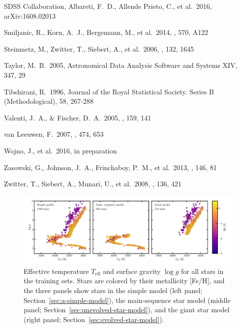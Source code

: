 \documentclass[preprint]{aastex}
\newcommand{\teff}{T_{\mathrm{eff}}}
\newcommand{\logg}{\log g}
\begin{document}
\begin{thebibliography}{dummy}
 SDSS Collaboration, Albareti, F.~D., Allende Prieto, C., et al.\ 2016, arXiv:1608.02013 

 Smiljanic, R., Korn, A.~J., Bergemann, M., et al.\ 2014, \aap, 570, A122 

 Steinmetz, M., Zwitter, T., Siebert, A., et al.\ 2006, \aj, 132, 1645 

 Taylor, M.~B.\ 2005, Astronomical Data Analysis Software and Systems XIV, 347, 29 

 Tibshirani, R.\ 1996, Journal of the Royal Statistical Society. Series B (Methodological), 58, 267-288

 Valenti, J.~A., \& Fischer, D.~A.\ 2005, \apjs, 159, 141 

 van Leeuwen, F.\ 2007, \aap, 474, 653 

 Wojno, J., et al.\ 2016, in preparation

 Zasowski, G., Johnson, J.~A., Frinchaboy, P.~M., et al.\ 2013, \aj, 146, 81 

 Zwitter, T., Siebert, A., Munari, U., et al.\ 2008, \aj, 136, 421 

\end{thebibliography}



\clearpage

\begin{figure}[p]
\includegraphics[width=\textwidth]{figures/hrd-train-set.pdf}
\caption{Effective temperature $\teff$ and surface gravity $\logg$ for all stars in the training sets. Stars are colored by their metallicity [Fe/H], and the three panels show stars in the simple model (left panel; Section~\ref{sec:a-simple-model}), the main-sequence star model (middle panel; Section~\ref{sec:unevolved-star-model}), and the giant star model (right panel; Section~\ref{sec:evolved-star-model}).\label{fig:training-set-hrd}}
\end{figure}
\end{document}
